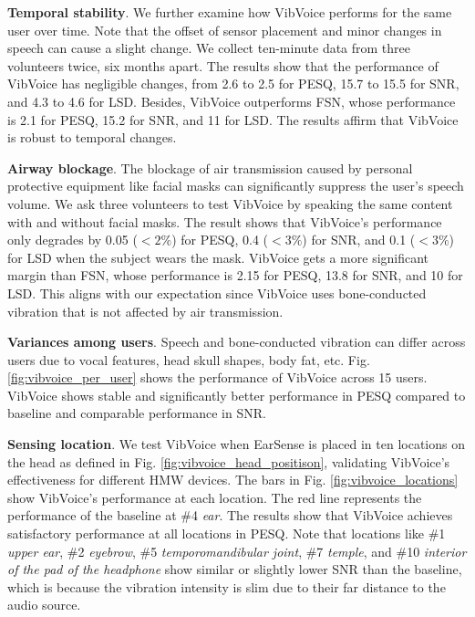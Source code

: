 \noindent\textbf{Temporal stability}.
We further examine how VibVoice performs for the same user over time. Note that the offset of sensor placement and minor changes in speech can cause a slight change. We collect ten-minute data from three volunteers twice, six months apart. 
The results show that the performance of VibVoice has negligible changes, from 2.6 to 2.5 for PESQ, 15.7 to 15.5 for SNR, and 4.3 to 4.6 for LSD. Besides, VibVoice outperforms FSN, whose performance is 2.1 for PESQ, 15.2 for SNR, and 11 for LSD.
The results affirm that VibVoice is robust to temporal changes.

\noindent\textbf{Airway blockage}.
The blockage of air transmission caused by personal protective equipment like facial masks can significantly suppress the user's speech volume. 
We ask three volunteers to test VibVoice by speaking the same content with and without facial masks.
The result shows that VibVoice's performance only degrades by 0.05 ($< 2\%$) for PESQ, 0.4 ($<3\%$) for SNR, and 0.1 ($<3\%$) for LSD when the subject wears the mask. 
VibVoice gets a more significant margin than FSN, whose performance is  2.15 for PESQ, 13.8 for SNR, and 10 for LSD. 
This aligns with our expectation since VibVoice uses bone-conducted vibration that is not affected by air transmission.

\noindent\textbf{Variances among users}.
Speech and bone-conducted vibration can differ across users due to vocal features, head skull shapes, body fat, etc.
Fig. \ref{fig:vibvoice_per_user} shows the performance of VibVoice across 15 users. VibVoice shows stable and significantly better performance in PESQ compared to baseline and comparable performance in SNR.

\noindent\textbf{Sensing location}.
We test VibVoice when EarSense is placed in ten locations on the head as defined in Fig. \ref{fig:vibvoice_head_positison}, validating VibVoice's effectiveness for different HMW devices.
The bars in Fig. \ref{fig:vibvoice_locations} show VibVoice's performance at each location. The red line represents the performance of the baseline at \#4 \emph{ear}. 
The results show that VibVoice achieves satisfactory performance at all locations in PESQ.
Note that locations like \#1 \emph{upper ear}, \#2 \emph{eyebrow}, \#5 \emph{temporomandibular joint}, \#7 \emph{temple}, and \#10 \emph{interior of the pad of the headphone} show similar or slightly lower SNR than the baseline, which is because the vibration intensity is slim due to their far distance to the audio source.

